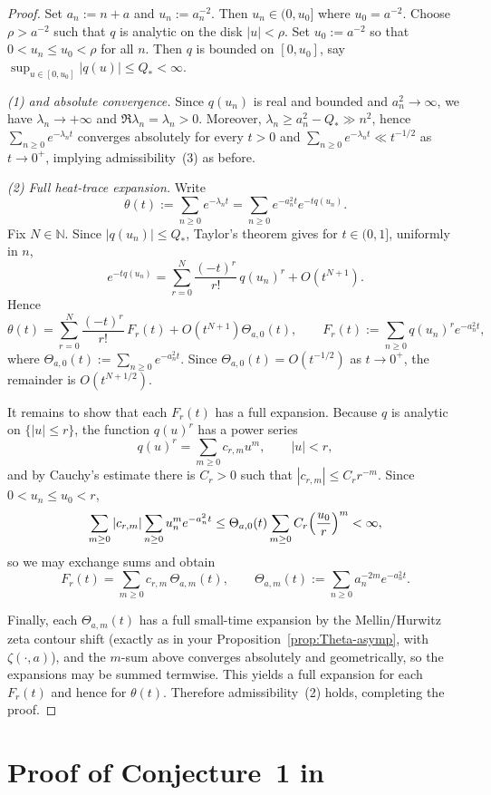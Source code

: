 \documentclass[11pt,letterpaper]{amsart}
\numberwithin{equation}{section}
\theoremstyle{definition}
\newcommand{\N}{\mathbb{N}}
\begin{document}
\begin{proof}
Set $a_n:=n+a$ and $u_n:=a_n^{-2}$. Then $u_n\in(0,u_0]$ where $u_0=a^{-2}$.
Choose $\rho>a^{-2}$ such that $q$ is analytic on the disk $|u|<\rho$.
Set $u_0:=a^{-2}$ so that $0<u_n\le u_0<\rho$ for all $n$.
Then $q$ is bounded on $[0,u_0]$, say $\sup_{u\in[0,u_0]}|q(u)|\le Q_*<\infty$.

\emph{(1) and absolute convergence.}
Since $q(u_n)$ is real and bounded and $a_n^2\to\infty$, we have $\lambda_n\to+\infty$ and
$\Re\lambda_n=\lambda_n>0$. Moreover, $\lambda_n\ge a_n^2-Q_*\gg n^2$, hence
$\sum_{n\ge0}e^{-\lambda_nt}$ converges absolutely for every $t>0$ and
$\sum_{n\ge0}e^{-\lambda_nt}\ll t^{-1/2}$ as $t\to0^+$, implying admissibility~(3) as before.

\emph{(2) Full heat-trace expansion.}
Write
\[
\theta(t):=\sum_{n\ge0}e^{-\lambda_nt}
=\sum_{n\ge0}e^{-a_n^2t}e^{-tq(u_n)}.
\]
Fix $N\in\N$. Since $|q(u_n)|\le Q_*$, Taylor's theorem gives for $t\in(0,1]$,
uniformly in $n$,
\[
e^{-tq(u_n)}=\sum_{r=0}^{N}\frac{(-t)^r}{r!}\,q(u_n)^r+O(t^{N+1}).
\]
Hence
\[
\theta(t)=\sum_{r=0}^{N}\frac{(-t)^r}{r!}\,F_r(t)+O(t^{N+1})\Theta_{a,0}(t),
\qquad
F_r(t):=\sum_{n\ge0}q(u_n)^r e^{-a_n^2t},
\]
where $\Theta_{a,0}(t):=\sum_{n\ge0}e^{-a_n^2t}$.
Since $\Theta_{a,0}(t)=O(t^{-1/2})$ as $t\to0^+$, the remainder is $O(t^{N+1/2})$.

It remains to show that each $F_r(t)$ has a full expansion.
Because $q$ is analytic on $\{|u|\le r\}$, the function $q(u)^r$ has a power series
\[
q(u)^r=\sum_{m\ge0}c_{r,m}u^m,\qquad |u|<r,
\]
and by Cauchy's estimate there is $C_r>0$ such that $|c_{r,m}|\le C_r r^{-m}$.
Since $0<u_n\le u_0<r$,
\[
\sum_{m\ge0}|c_{r,m}|\sum_{n\ge0}u_n^m e^{-a_n^2t}
\le \Theta_{a,0}(t)\sum_{m\ge0}C_r\Bigl(\frac{u_0}{r}\Bigr)^m<\infty,
\]
so we may exchange sums and obtain
\[
F_r(t)=\sum_{m\ge0}c_{r,m}\,\Theta_{a,m}(t),
\qquad
\Theta_{a,m}(t):=\sum_{n\ge0}a_n^{-2m}e^{-a_n^2t}.
\]

Finally, each $\Theta_{a,m}(t)$ has a full small-time expansion by the Mellin/Hurwitz zeta
contour shift (exactly as in your Proposition~\ref{prop:Theta-asymp}, with $\zeta(\cdot,a)$),
and the $m$-sum above converges absolutely and geometrically, so the expansions may be summed termwise.
This yields a full expansion for each $F_r(t)$ and hence for $\theta(t)$.
Therefore admissibility~(2) holds, completing the proof.
\end{proof}


\section{Proof of Conjecture~1 in \cite{BOCRS}}\label{sec:conj1}
\end{document}
